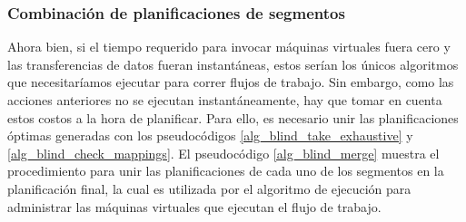 \subsubsection{Combinación de planificaciones de segmentos}

Ahora bien, si el tiempo requerido para invocar máquinas virtuales fuera cero y las transferencias de datos fueran instantáneas, estos serían los únicos algoritmos que necesitaríamos ejecutar para correr flujos de trabajo. Sin embargo, como las acciones anteriores no se ejecutan instantáneamente, hay que tomar en cuenta estos costos a la hora de planificar. Para ello, es necesario unir las planificaciones \'optimas generadas con los pseudoc\'odigos \ref{alg_blind_take_exhaustive} y \ref{alg_blind_check_mappings}. El pseudoc\'odigo \ref{alg_blind_merge} muestra el procedimiento para unir las planificaciones de cada uno de los segmentos en la planificación final, la cual es utilizada por el algoritmo de ejecuci\'on para administrar las m\'aquinas virtuales que ejecutan el flujo de trabajo.



